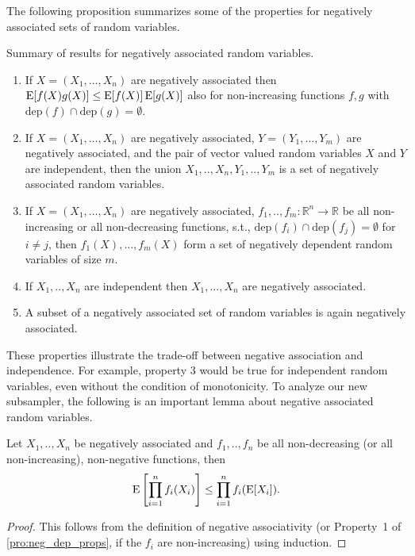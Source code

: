 The following proposition summarizes some of the properties for negatively associated sets of random variables.
\begin{proposition}\label{pro:neg_dep_props}
Summary of results for negatively associated random variables.
\begin{enumerate}
\item If $X=(X_1,\ldots,X_n)$ are negatively associated then $\operatorname{\mathrm{E}} [f(X) g(X)] \leq \operatorname{\mathrm{E}} [f(X)] \operatorname{\mathrm{E}} [g(X)]$ also for non-increasing functions $f,g$ with $\mathrm{dep}(f) \cap \mathrm{dep}(g) = \emptyset$.
\item If $X=(X_1,\ldots,X_n)$ are negatively associated, $Y=(Y_1,\ldots,Y_m)$ are negatively associated, and the pair of vector valued random variables $X$ and $Y$ are independent, then the union $X_1,..,X_n,Y_1,..,Y_m$ is a set of negatively associated random variables.
\item If $X=(X_1,\ldots,X_n)$ are negatively associated, $f_1,..,f_m : \mathbb R^n \rightarrow \mathbb R$ be all non-increasing or all non-decreasing functions, s.t., $\mathrm{dep}(f_i) \cap \mathrm{dep}(f_j) = \emptyset$ for $i \neq j$, then $f_1(X),\ldots,f_m(X)$ form a set of negatively dependent random variables of size $m$.
\item If $X_1,..,X_n$ are independent then $X_1,...,X_n$ are negatively associated.
\item A subset of a negatively associated set of random variables is again negatively associated.
\end{enumerate}
\end{proposition}

These properties illustrate the trade-off between negative association and independence.
For example, property 3 would be true for independent random variables, even without the condition of monotonicity.
To analyze our new subsampler, the following is an important lemma about negative associated random variables.

\begin{lemma}\label{le:neg_assoc_prod}
Let $X_1,..,X_n$ be negatively associated and $f_1,..,f_n$ be all non-decreasing (or all non-increasing), non-negative functions, then
\[
  \operatorname{\mathrm{E}} \left[\prod_{i=1}^{n} f_i(X_i)\right] \leq \prod_{i=1}^{n} f_i(\operatorname{\mathrm{E}} [X_i]) \textrm{.}
\]
\end{lemma}
\begin{proof}
This follows from the definition of negative associativity (or Property~1 of \cref{pro:neg_dep_props}, if the $f_i$ are non-increasing) using induction.
\end{proof}

